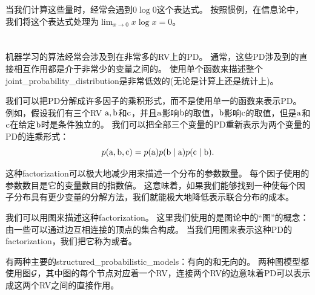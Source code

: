 当我们计算这些量时，经常会遇到$0\log 0$这个表达式。
按照惯例，在信息论中，我们将这个表达式处理为$\lim_{x \to 0} x\log x = 0$。


\section{}
\label{sec:structured_probabilistic_models_chap3}

机器学习的算法经常会涉及到在非常多的\gls{RV}上的\gls{PD}。
通常，这些\gls{PD}涉及到的直接相互作用都是介于非常少的变量之间的。
使用单个函数来描述整个\gls{joint_probability_distribution}是非常低效的(无论是计算上还是统计上)。

我们可以把\gls{PD}分解成许多因子的乘积形式，而不是使用单一的函数来表示\gls{PD}。
例如，假设我们有三个\gls{RV} $\mathrm{a}, \mathrm{b}$和$\mathrm{c}$，并且$\mathrm{a}$影响$\mathrm{b}$的取值，$\mathrm{b}$影响$\mathrm{c}$的取值，但是$\mathrm{a}$和$\mathrm{c}$在给定$\mathrm{b}$时是条件独立的。
我们可以把全部三个变量的\gls{PD}重新表示为两个变量的\gls{PD}的连乘形式：
\begin{equation}
p(\mathrm{a}, \mathrm{b}, \mathrm{c}) = p(\mathrm{a})p(\mathrm{b}\mid \mathrm{a})p(\mathrm{c}\mid\mathrm{b}).
\end{equation}

这种\gls{factorization}可以极大地减少用来描述一个分布的参数数量。
每个因子使用的参数数目是它的变量数目的指数倍。
这意味着，如果我们能够找到一种使每个因子分布具有更少变量的分解方法，我们就能极大地降低表示联合分布的成本。

我们可以用图来描述这种\gls{factorization}。
这里我们使用的是图论中的``图''的概念：由一些可以通过边互相连接的顶点的集合构成。
当我们用图来表示这种\gls{PD}的\gls{factorization}，我们把它称为或者。

有两种主要的\gls{structured_probabilistic_models}：有向的和无向的。
两种图模型都使用图$\mathcal{G}$，其中图的每个节点对应着一个\gls{RV}，连接两个\gls{RV}的边意味着\gls{PD}可以表示成这两个\gls{RV}之间的直接作用。

